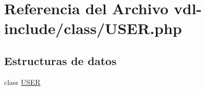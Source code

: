 \hypertarget{USER_8php}{\section{Referencia del Archivo vdl-\/include/class/\-U\-S\-E\-R.php}
\label{USER_8php}
}
\subsection*{Estructuras de datos}
\begin{DoxyCompactItemize}
\item 
class \hyperlink{classUSER}{U\-S\-E\-R}
\end{DoxyCompactItemize}
